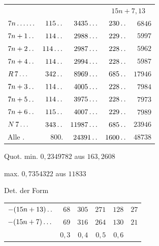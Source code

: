\begin{center}\begin{tabular}{@{}lrrrr@{}}
& & & \multicolumn{2}{c}{$15n+7{,}13$}\\
$7n\mathinner{.\,.\,.\,.\,.\,.}$ & $115\mathinner{.\,.}$ & $3435\mathinner{.\,.\,.}$ & $230\mathinner{.\,.}$ & $6846$\\
$7n+1\mathinner{.\,.}$ & $114\mathinner{.\,.}$ & $2988\mathinner{.\,.\,.}$ & $229\mathinner{.\,.}$ & $5997$\\
$7n+2\mathinner{.\,.}$ & $114\mathinner{.\,.\,.}$ & $2987\mathinner{.\,.\,.}$ & $228\mathinner{.\,.}$ & $5962$\\
$7n+4\mathinner{.\,.}$ & $114\mathinner{.\,.}$ & $2994\mathinner{.\,.\,.}$ & $228\mathinner{.\,.}$ & $5987$\\
$R\,7\mathinner{.\,.\,.}$ & $342\mathinner{.\,.}$ & $8969\mathinner{.\,.\,.}$ & $685\mathinner{.\,.}$ & $17946$\\
$7n+3\mathinner{.\,.}$ & $114\mathinner{.\,.}$ & $4005\mathinner{.\,.\,.}$ & $228\mathinner{.\,.}$ & $7984$\\
$7n+5\mathinner{.\,.}$ & $114\mathinner{.\,.}$ & $3975\mathinner{.\,.\,.}$ & $228\mathinner{.\,.}$ & $7973$\\
$7n+6\mathinner{.\,.}$ & $115\mathinner{.\,.}$ & $4007\mathinner{.\,.\,.}$ & $229\mathinner{.\,.}$ & $7989$\\
$N\,7\mathinner{.\,.\,.}$ & $343\mathinner{.\,.}$ & $11987\mathinner{.\,.\,.}$ & $685\mathinner{.\,.}$ & $23946$\\
Alle . & $800.$ & $24391\mathinner{.\,.}$ & $1600\mathinner{.\,.}$ & $48738$
\end{tabular}\end{center}
\noindent Quot. min. $0{,}2349782$ aus $163{,}2608$
\par\noindent\quad max. $0{,}7354322$ aus $11833$
\par\noindent Det. der Form
\begin{center}\begin{tabular}{@{}lrrrrr@{}}
$-(15n+13)\mathinner{.\,.}$ & $68$ & $305$ & $271$ & $128$ & $27$\\
$-(15n+7)\mathinner{.\,.\,.}$ & $69$ & $316$ & $264$ & $130$ & $21$\\
& $0{,}3$ & $0{,}4$ & $0{,}5$ & $0{,}6$ &
\end{tabular}\end{center}
\par\medskip
{}
